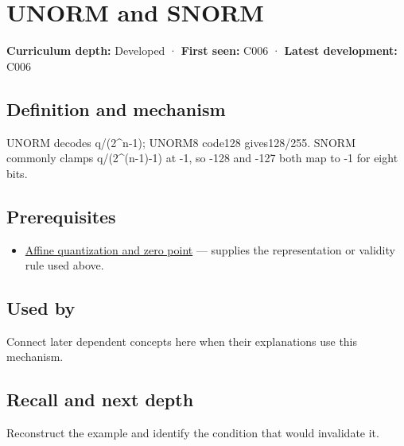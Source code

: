 \hypertarget{appendix-b2402c453dac}{}\label{referencestart:appendix-b2402c453dac}
\section{UNORM and SNORM}\label{appendix-b2402c453dac-unorm-and-snorm}

\textbf{Curriculum depth:} Developed · \textbf{First seen:} C006 · \textbf{Latest development:} C006

\begin{allmightroledefinition}

\subsection{Definition and mechanism}\label{appendix-b2402c453dac-definition-and-mechanism}

UNORM decodes q/(2\^{}n-1); UNORM8 code128 gives128/255. SNORM commonly clamps q/(2\^{}(n-1)-1) at -1, so -128 and -127 both map to -1 for eight bits.

\end{allmightroledefinition}

\subsection{Prerequisites}\label{appendix-b2402c453dac-prerequisites}

\begin{itemize}
\tightlist
\item
  \hyperref[appendix-d5da3eaabaef]{Affine quantization and zero point} --- supplies the representation or validity rule used above.
\end{itemize}

\subsection{Used by}\label{appendix-b2402c453dac-used-by}

Connect later dependent concepts here when their explanations use this mechanism.

\subsection{Recall and next depth}\label{appendix-b2402c453dac-recall-and-next-depth}

Reconstruct the example and identify the condition that would invalidate it.

